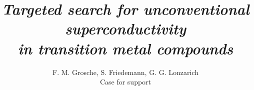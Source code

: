 \documentclass[twocolumn,prl,a4paper,tightenlines,10pt]{revtex4-2}
\begin{document}


\newcommand{\Figures}{/Users/fmg12/Documents/data/Figures}


\title {\textit{Targeted search for unconventional superconductivity \\ in transition metal compounds}}

\author {F. M. Grosche, S. Friedemann, G. G. Lonzarich
\\ \vspace{0.2cm}
Case for support}

\begin{abstract}
\vspace{-0.8cm} 
\noindent 

\end{abstract}
\setlength{\columnsep}{2em}
\fontsize{10.9pt}{12.1pt}\selectfont
\maketitle
%

\setlength{\columnsep}{2em}

\vspace{-0.5em}


\clearpage
%
%

\end{document}

